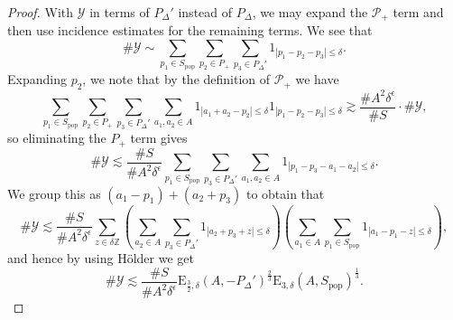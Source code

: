 \documentclass[12pt]{amsart}
\newcommand{\1}{\mathbf{1}}
\begin{document}
\begin{proof}
With \(\mathcal{Y} \) in terms of \(P_{\Delta} '\) instead of \(P_{\Delta} \), we may expand the \(\mathcal{P} _{+} \) term
and then use incidence estimates for the remaining terms.
We see that
\[
	\# \mathcal{Y}  \sim \sum _{p_1 \in S_{\text{pop}}   } \sum _{p_2 \in P_{+} } \sum _{p_3 \in P_{\Delta} ' }  1_{\left\lvert p_1 - p_2 - p_3 \right\rvert \leq \delta}
.\]
Expanding \(p_2\), we note that by the definition of \(\mathcal{P} _{+}  \) we have
\[
	\sum _{p_1 \in S_{\text{pop}} } \sum _{p_2 \in P_{+} } \sum _{p_3 \in P_{\Delta}' } \sum _{a_1,a_2 \in A} 1_{\left\lvert a_1 + a_2 - p_2 \right\rvert \leq \delta} 1_{\left\lvert p_1-p_2-p_3 \right\rvert \leq \delta} \gtrsim \frac{\# A ^{2} \delta^{\epsilon}}{\# S} \cdot \# \mathcal{Y} 
,\]
so eliminating the \(P_{+} \) term gives
\[
	\# \mathcal{Y}  \lesssim \frac{\# S}{\# A ^{2}\delta^{\epsilon}} \sum _{p_1 \in S_{\text{pop}} } \sum _{p_3 \in P_{\Delta}' } \sum _{a_1,a_2 \in A} 1_{\left\lvert p_1-p_3-a_1 - a_2 \right\rvert \leq \delta} 
.\]
We group this as \((a_1 - p_1) + (a_2 + p_3)\) to obtain that
\[
	\# \mathcal{Y}  \lesssim \frac{\# S}{\# A ^{2} \delta^{\epsilon}} 	\sum _{z \in \delta \mathbb{Z} } \left( \sum _{a_2 \in A} \sum _{p_3 \in P_{\Delta}' }  1_{\left\lvert a_2 + p_3 + z \right\rvert \leq \delta}  \right) \left( \sum _{a_1 \in A} \sum _{p_1 \in S _{\text{pop}} 	}  1_{\left\lvert a_1 - p_1 - z \right\rvert \leq \delta} \right) 
,\]
and hence by using H\"older we get
\[
	\# \mathcal{Y}  \lesssim \frac{\# S}{\# A ^{2}\delta^{\epsilon}} \mathrm{E} _{\frac{3}{2} ,\delta} (A,- P_{\Delta}' )^{\frac{2}{3} } \mathrm{E} _{3,\delta} (A, S_{\text{pop}} )^{\frac{1}{3} }
.\]


\end{proof}
\end{document}
